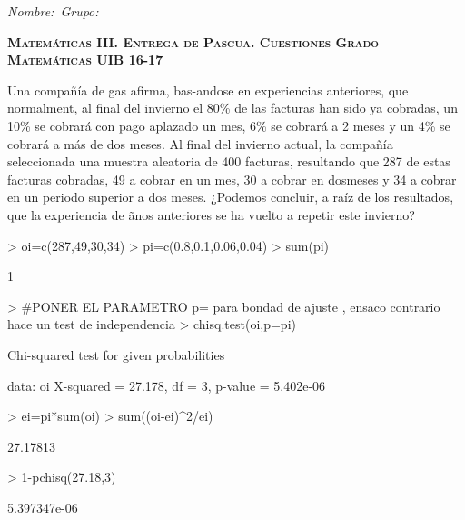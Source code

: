 \documentclass[10pt,spanish,es-nodecimaldot]{article}
\newcounter{problemes}
\newcounter{punts} \def\thepunts{\arabic{punts}}
\def\probl{\addtocounter{problemes}{1} \setcounter{punts}{0}
\medskip\noindent{\bf \theproblemes) }}
\begin{document}




\emph{Nombre:}\hfill\hfill\hfill\hfill\hfill\ \emph{Grupo:}\hfill \medskip
\setcounter{problemes}{0}

\begin{center}
\textsc{\textbf{Matemáticas III. Entrega de Pascua. Cuestiones Grado Matemáticas UIB 16-17}}\\[1ex]%
\end{center}





\probl  Una compañía de gas afirma, bas-andose en experiencias anteriores, que normalment, al final del invierno el 80\%
de las facturas han sido ya cobradas, un 10\% se cobrará con pago aplazado un mes, 6\% se cobrará a  2 meses y un 4\% se cobrará a más de  dos meses. Al final del invierno actual, la compañía seleccionada una muestra aleatoria de 400 facturas, resultando que 287 de estas facturas cobradas, 49 a cobrar en un mes, 30 a cobrar en dosmeses y 34 a cobrar en un periodo  superior a dos meses.  ¿Podemos concluir, a raíz de los resultados, que la experiencia de ãnos anteriores se ha vuelto a repetir este invierno?


\begin{Schunk}
\begin{Sinput}
> oi=c(287,49,30,34)
> pi=c(0.8,0.1,0.06,0.04)
> sum(pi)
\end{Sinput}
\begin{Soutput}
[1] 1
\end{Soutput}
\begin{Sinput}
> #PONER EL PARAMETRO p= para bondad de ajuste , ensaco contrario hace un test de independencia
> chisq.test(oi,p=pi)
\end{Sinput}
\begin{Soutput}
	Chi-squared test for given probabilities

data:  oi
X-squared = 27.178, df = 3, p-value = 5.402e-06
\end{Soutput}
\end{Schunk}


\begin{Schunk}
\begin{Sinput}
> ei=pi*sum(oi)
> sum((oi-ei)^2/ei)
\end{Sinput}
\begin{Soutput}
[1] 27.17813
\end{Soutput}
\begin{Sinput}
> 1-pchisq(27.18,3)
\end{Sinput}
\begin{Soutput}
[1] 5.397347e-06
\end{Soutput}
\end{Schunk}
\end{document}
